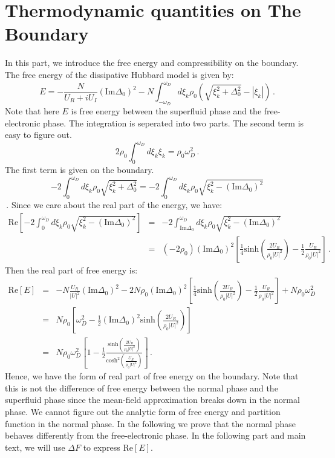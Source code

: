 \documentclass[aps,onecolumn,nofootinbib,superscriptaddress,notitlepage,longbibliography]{revtex4-1}
\begin{document}
\section{Thermodynamic quantities on The Boundary}

In this part, we introduce the free energy and compressibility on
the boundary. The free energy of the dissipative Hubbard model is
given by: 
\begin{equation}
E=-\frac{N}{U_{R}+iU_{I}}\left(\text{Im}\Delta_{0}\right)^{2}-N\int_{-\omega_{D}}^{\omega_{D}}d\xi_{k}\rho_{0}\left(\sqrt{\xi_{k}^{2}+\Delta_{0}^{2}}-|\xi_{k}|\right)\,.
\end{equation}
Note that here $E$ is free energy between the superfluid phase and
the free-electronic phase. The integration is seperated into two parts.
The second term is easy to figure out. 
\begin{equation}
2\rho_{0}\int_{0}^{\omega_{D}}d\xi_{k}\xi_{k}=\rho_{0}\omega_{D}^{2}\,.
\end{equation}
The first term is given on the boundary. 
\[
-2\int_{0}^{\omega_{D}}d\xi_{k}\rho_{0}\sqrt{\xi_{k}^{2}+\Delta_{0}^{2}}=-2\int_{0}^{\omega_{D}}d\xi_{k}\rho_{0}\sqrt{\xi_{k}^{2}-\left(\text{Im}\Delta_{0}\right)^{2}}
\]
\,. Since we care about the real part of the energy, we have: 
\begin{eqnarray}
\text{Re}\left[-2\int_{0}^{\omega_{D}}d\xi_{k}\rho_{0}\sqrt{\xi_{k}^{2}-\left(\text{Im}\Delta_{0}\right)^{2}}\right] & = & -2\int_{\text{Im}\Delta_{0}}^{\omega_{D}}d\xi_{k}\rho_{0}\sqrt{\xi_{k}^{2}-\left(\text{Im}\Delta_{0}\right)^{2}}\nonumber \\
 & = & (-2\rho_{0})\left(\text{Im}\Delta_{0}\right)^{2}\left[\frac{1}{4}\text{sinh}\left(\frac{2U_{R}}{\rho_{0}|U|^{2}}\right)-\frac{1}{2}\frac{U_{R}}{\rho_{0}|U|^{2}}\right]\,.
\end{eqnarray}
Then the real part of free energy is: 
\begin{eqnarray}
\text{Re}[E] & = & -N\frac{U_{R}}{|U|^{2}}\left(\text{Im}\Delta_{0}\right)^{2}-2N\rho_{0}\left(\text{Im}\Delta_{0}\right)^{2}\left[\frac{1}{4}\text{sinh}\left(\frac{2U_{R}}{\rho_{0}|U|^{2}}\right)-\frac{1}{2}\frac{U_{R}}{\rho_{0}|U|^{2}}\right]+N\rho_{0}\omega_{D}^{2}\nonumber \\
 & = & N\rho_{0}\left[\omega_{D}^{2}-\frac{1}{2}\left(\text{Im}\Delta_{0}\right)^{2}\text{sinh}\left(\frac{2U_{R}}{\rho_{0}|U|^{2}}\right)\right]\nonumber \\
 & = & N\rho_{0}\omega_{D}^{2}\left[1-\frac{1}{2}\frac{\text{sinh}\left(\frac{2U_{R}}{\rho_{0}|U|^{2}}\right)}{\text{cosh}^{2}\left(\frac{U_{R}}{\rho_{0}|U|^{2}}\right)}\right]\,.\label{free}
\end{eqnarray}
Hence, we have the form of real part of free energy on the boundary.
Note that this is not the difference of free energy between the normal
phase and the superfluid phase since the mean-field approximation
breaks down in the normal phase. We cannot figure out the analytic
form of free energy and partition function in the normal phase. In
the following we prove that the normal phase behaves differently from
the free-electronic phase. In the following part and main text, we
will use $\Delta F$ to express $\text{Re}[E]$.
\end{document}
